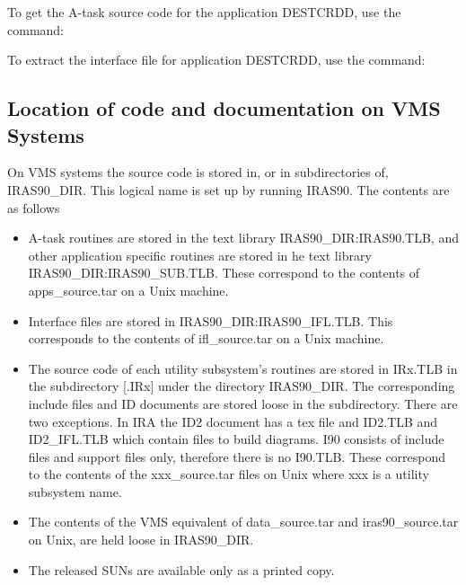 \documentclass[twoside,11pt,nolof]{starlink}
\begin{document}
To get the A-task source code for the application {\small DESTCRDD}, use
the command:

\small
\begin{terminalv}
\end{terminalv}
\normalsize

To extract the interface file for application {\small DESTCRDD}, use the
command:

\small
\begin{terminalv}
\end{terminalv}
\normalsize

\subsection{Location of code and documentation on VMS Systems
\label{SEC:VMSS}}

On {\small VMS} systems the source code is stored in, or in subdirectories of,
{\small IRAS90\_DIR}. This logical name is set up by running {\small IRAS90}.
The contents are as follows

\begin{itemize}

\item A-task routines are stored in the text library
{\small IRAS90\_DIR:IRAS90.TLB}, and other application specific
routines are stored in he text library {\small
IRAS90\_DIR:IRAS90\_SUB.TLB}. These correspond to the contents of
apps\_source.tar on a Unix machine.

\item Interface files are stored in {\small IRAS90\_DIR:IRAS90\_IFL.TLB}.
This corresponds to the contents of ifl\_source.tar on a Unix machine.

\item The source code of each utility subsystem's  routines are stored
in IRx.TLB  in the subdirectory [.IRx] under the directory IRAS90\_DIR.
The corresponding include files and {\small ID} documents are stored loose
in the subdirectory. There are two exceptions. In {\small IRA} the {\small ID2}
document has a tex file and {\small ID2.TLB} and {\small ID2\_IFL.TLB} which
contain files to build diagrams. {\small I90} consists of include files
and support files only, therefore there is no {\small I90.TLB}.  These
correspond to the contents of the xxx\_source.tar files on Unix where xxx is a
utility subsystem name.

\item The contents of the VMS equivalent of data\_source.tar and
iras90\_source.tar on Unix, are held loose in {\small IRAS90\_DIR}.

\item The released SUNs are available only as a printed copy.

\end{itemize}
\end{document}
